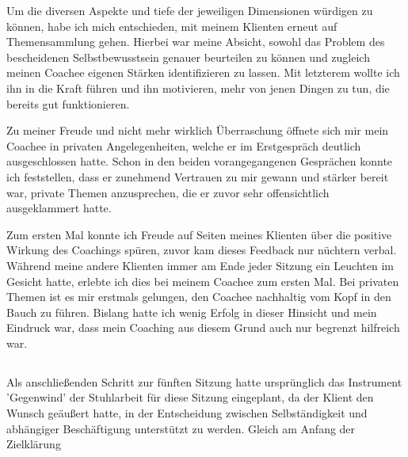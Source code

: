 \documentclass[11pt,a4paper]{article}
\begin{document}
Um die diversen Aspekte und tiefe der jeweiligen Dimensionen würdigen zu können, habe ich mich entschieden, mit meinem Klienten erneut auf Themensammlung gehen. Hierbei war meine Absicht, sowohl das Problem des bescheidenen Selbstbewusstsein genauer beurteilen zu können und zugleich meinen Coachee eigenen Stärken identifizieren zu lassen. Mit letzterem wollte ich ihn in die Kraft führen und ihn motivieren, mehr von jenen Dingen zu tun, die bereits gut funktionieren. 

Zu meiner Freude und nicht mehr wirklich Überraschung öffnete sich mir mein Coachee in privaten Angelegenheiten, welche er im Erstgespräch deutlich ausgeschlossen hatte. Schon in den beiden vorangegangenen Gesprächen konnte ich feststellen, dass er zunehmend Vertrauen zu mir gewann und stärker bereit war, private Themen anzusprechen, die er zuvor sehr offensichtlich ausgeklammert hatte.


Zum ersten Mal konnte ich Freude auf Seiten meines Klienten über die positive Wirkung des Coachings spüren, zuvor kam dieses Feedback nur nüchtern verbal. Während meine andere Klienten immer am Ende jeder Sitzung ein Leuchten im Gesicht hatte, erlebte ich dies bei meinem Coachee zum ersten Mal. Bei privaten Themen ist es mir erstmals gelungen, den Coachee nachhaltig vom Kopf in den Bauch zu führen. Bislang hatte ich wenig Erfolg in dieser Hinsicht und mein Eindruck war, dass mein Coaching aus diesem Grund auch nur begrenzt hilfreich war.


\subsection*{\color{Orange}{Sechste Sitzung: Abschlusssitzung}}

Als anschließenden Schritt zur fünften Sitzung hatte ursprünglich das Instrument 'Gegenwind' der Stuhlarbeit für diese Sitzung eingeplant, da der Klient den Wunsch geäußert hatte, in der Entscheidung zwischen Selbständigkeit und abhängiger Beschäftigung unterstützt zu werden. Gleich am Anfang der Zielklärung
\end{document}
